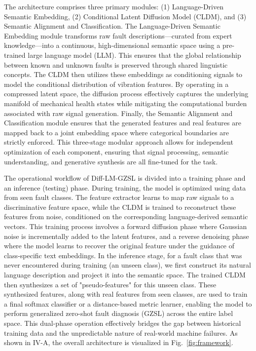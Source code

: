 \documentclass[journal]{IEEEtran}
\begin{document}
The architecture comprises three primary modules: (1) Language-Driven Semantic Embedding, (2) Conditional Latent Diffusion Model (CLDM), and (3) Semantic Alignment and Classification. The Language-Driven Semantic Embedding module transforms raw fault descriptions—curated from expert knowledge—into a continuous, high-dimensional semantic space using a pre-trained large language model (LLM). This ensures that the global relationship between known and unknown faults is preserved through shared linguistic concepts. The CLDM then utilizes these embeddings as conditioning signals to model the conditional distribution of vibration features. By operating in a compressed latent space, the diffusion process effectively captures the underlying manifold of mechanical health states while mitigating the computational burden associated with raw signal generation. Finally, the Semantic Alignment and Classification module ensures that the generated features and real features are mapped back to a joint embedding space where categorical boundaries are strictly enforced. This three-stage modular approach allows for independent optimization of each component, ensuring that signal processing, semantic understanding, and generative synthesis are all fine-tuned for the task.

The operational workflow of Diff-LM-GZSL is divided into a training phase and an inference (testing) phase. During training, the model is optimized using data from seen fault classes. The feature extractor learns to map raw signals to a discriminative feature space, while the CLDM is trained to reconstruct these features from noise, conditioned on the corresponding language-derived semantic vectors. This training process involves a forward diffusion phase where Gaussian noise is incrementally added to the latent features, and a reverse denoising phase where the model learns to recover the original feature under the guidance of class-specific text embeddings. In the inference stage, for a fault class that was never encountered during training (an unseen class), we first construct its natural language description and project it into the semantic space. The trained CLDM then synthesizes a set of "pseudo-features" for this unseen class. These synthesized features, along with real features from seen classes, are used to train a final softmax classifier or a distance-based metric learner, enabling the model to perform generalized zero-shot fault diagnosis (GZSL) across the entire label space. This dual-phase operation effectively bridges the gap between historical training data and the unpredictable nature of real-world machine failures. As shown in IV-A, the overall architecture is visualized in Fig.~\ref{fig:framework}.
\end{document}
